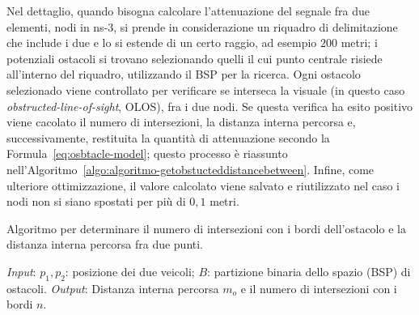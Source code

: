 Nel dettaglio, quando bisogna calcolare l'attenuazione del segnale fra due elementi, nodi in ns-3, si prende in considerazione un riquadro di delimitazione
che include i due e lo si estende
di un certo raggio, ad esempio $200$ metri; i potenziali ostacoli si trovano
selezionando quelli il cui punto centrale risiede all'interno del riquadro, utilizzando il BSP per la ricerca.
Ogni ostacolo selezionado viene controllato per verificare se interseca la visuale
(in questo caso \textit{obstructed-line-of-sight}, OLOS), fra i due nodi.
Se questa verifica ha esito positivo viene cacolato il numero di intersezioni, la distanza interna percorsa e,
successivamente, restituita la quantità di attenuazione secondo la Formula~\ref{eq:osbtacle-model};
questo processo è riassunto nell'Algoritmo~\ref{algo:algoritmo-getobstucteddistancebetween}.
Infine, come ulteriore ottimizzazione, il valore calcolato viene salvato e riutilizzato nel caso i nodi non si siano spostati per più di $0,1$ metri.
%
\begin{italianalgorithm}[h]
\caption{Algoritmo per determinare il numero di intersezioni con i bordi dell'ostacolo e la distanza interna percorsa fra due punti.}\label{algo:algoritmo-getobstucteddistancebetween}
\begin{algorithmic}[1]
	\BState{}\emph{Input}: $p_1, p_2$: posizione dei due veicoli; $B$: partizione binaria dello spazio (BSP) di ostacoli.
	\BState{}\emph{Output}: Distanza interna percorsa $m_o$ e il numero di intersezioni con i bordi $n$.
			\label{algo:line:getobstucteddistancebetween-interesezione}
				\EndIf{}
			\EndFor{}
		\EndIf{}
	\EndFor{}
	\EndProcedure{}
\end{algorithmic}
\end{italianalgorithm}
